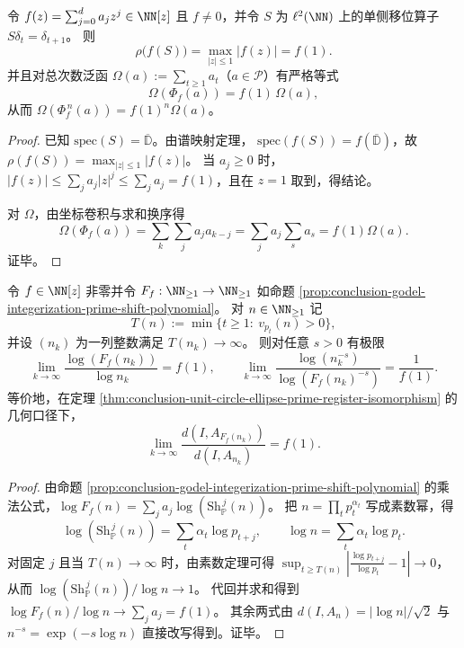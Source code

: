 \begin{proposition}[谱半径与总次数放大因子]\label{prop:conclusion-polynomial-algorithm-spectral-radius-mass}
令 \(f(z)=\sum_{j=0}^d a_j z^j\in\NN[z]\) 且 \(f\neq 0\)，并令 \(S\) 为 \(\ell^2(\NN)\) 上的单侧移位算子 \(S\delta_t=\delta_{t+1}\)。
则
\[
\rho\!\bigl(f(S)\bigr)=\max_{|z|\le 1}|f(z)|=f(1).
\]
并且对总次数泛函 \(\Omega(a):=\sum_{t\ge 1}a_t\)（\(a\in\mathcal P\)）有严格等式
\[
\Omega(\Phi_f(a))=f(1)\,\Omega(a),
\]
从而 \(\Omega(\Phi_f^{\,n}(a))=f(1)^n\Omega(a)\)。
\end{proposition}
\begin{proof}
已知 \(\mathrm{spec}(S)=\overline{\mathbb D}\)。由谱映射定理，
\(
\mathrm{spec}(f(S))=f(\overline{\mathbb D})
\)，故
\(
\rho(f(S))=\max_{|z|\le 1}|f(z)|
\)。
当 \(a_j\ge 0\) 时，\(|f(z)|\le \sum_j a_j|z|^j\le \sum_j a_j=f(1)\)，且在 \(z=1\) 取到，得结论。
\par
对 \(\Omega\)，由坐标卷积与求和换序得
\[
\Omega(\Phi_f(a))
=\sum_k\sum_j a_j a_{k-j}
=\sum_j a_j\sum_s a_s
=f(1)\Omega(a).
\]
证毕。
\end{proof}

\begin{proposition}[高素数端的椭圆重整化指数]\label{prop:conclusion-prime-shift-ellipse-renormalization-exponent}
令 \(f\in\NN[z]\) 非零并令 \(F_f:\NN_{\ge 1}\to\NN_{\ge 1}\) 如命题 \ref{prop:conclusion-godel-integerization-prime-shift-polynomial}。
对 \(n\in\NN_{\ge 1}\) 记
\[
T(n):=\min\{t\ge 1:\ v_{p_t}(n)>0\},
\]
并设 \((n_k)\) 为一列整数满足 \(T(n_k)\to\infty\)。
则对任意 \(s>0\) 有极限
\[
\lim_{k\to\infty}\frac{\log (F_f(n_k))}{\log n_k}=f(1),
\qquad
\lim_{k\to\infty}\frac{\log(n_k^{-s})}{\log(F_f(n_k)^{-s})}=\frac{1}{f(1)}.
\]
等价地，在定理 \ref{thm:conclusion-unit-circle-ellipse-prime-register-isomorphism} 的几何口径下，
\[
\lim_{k\to\infty}\frac{d(I,A_{F_f(n_k)})}{d(I,A_{n_k})}=f(1).
\]
\end{proposition}
\begin{proof}
由命题 \ref{prop:conclusion-godel-integerization-prime-shift-polynomial} 的乘法公式，\(\log F_f(n)=\sum_j a_j\log(\mathrm{Sh}_{\mathbb P}^{\,j}(n))\)。
把 \(n=\prod_t p_t^{\alpha_t}\) 写成素数幂，得
\[
\log(\mathrm{Sh}_{\mathbb P}^{\,j}(n))=\sum_t \alpha_t\log p_{t+j},
\qquad
\log n=\sum_t \alpha_t\log p_t.
\]
对固定 \(j\) 且当 \(T(n)\to\infty\) 时，由素数定理可得
\(
\sup_{t\ge T(n)}\left|\frac{\log p_{t+j}}{\log p_t}-1\right|\to 0
\)，从而
\(
\log(\mathrm{Sh}_{\mathbb P}^{\,j}(n))/\log n\to 1
\)。
代回并求和得到
\(
\log F_f(n)/\log n\to \sum_j a_j=f(1)
\)。
其余两式由 \(d(I,A_n)=|\log n|/\sqrt2\) 与 \(n^{-s}=\exp(-s\log n)\) 直接改写得到。证毕。
\end{proof}



\endinput
